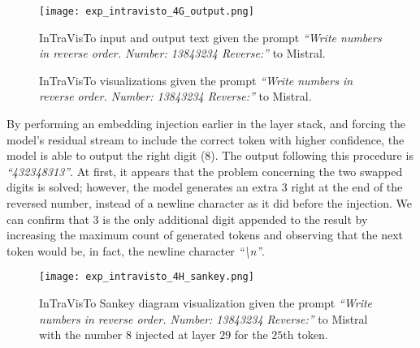 \begin{figure}[tp!]
    \centering
    \texttt{[image: exp\_intravisto\_4G\_output.png]}
    \caption{InTraVisTo input and output text given the prompt \emph{``Write numbers in reverse order. Number: 13843234 Reverse:''} to Mistral.}
    \label{fig:exp_intravisto_4_G1}
\end{figure}

\begin{figure}[tp!]
    \centering
    \quad
    \caption{InTraVisTo visualizations given the prompt \emph{``Write numbers in reverse order. Number: 13843234 Reverse:''} to Mistral.}
    \label{fig:exp_intravisto_4_G}
\end{figure}

By performing an embedding injection earlier in the layer stack, and forcing the model's residual stream to include the correct token with higher confidence, the model is able to output the right digit ($8$).
The output following this procedure is \emph{``432348313''}.
At first, it appears that the problem concerning the two swapped digits is solved; however, the model generates an extra $3$ right at the end of the reversed number, instead of a newline character as it did before the injection.
We can confirm that $3$ is the only additional digit appended to the result by increasing the maximum count of generated tokens and observing that the next token would be, in fact, the newline character \emph{``\textbackslash{}n''}.

\begin{figure}[t!]
    \centering
    \texttt{[image: exp\_intravisto\_4H\_sankey.png]}
    \caption[InTraVisTo Sankey diagram visualization given the prompt \emph{``Write numbers in reverse order. Number: 13843234 Reverse:''} to Mistral with injection.]{InTraVisTo Sankey diagram visualization given the prompt \emph{``Write numbers in reverse order. Number: 13843234 Reverse:''} to Mistral with the number $8$ injected at layer $29$ for the $25$th token.}
    \label{fig:exp_intravisto_4_H1}
\end{figure}


